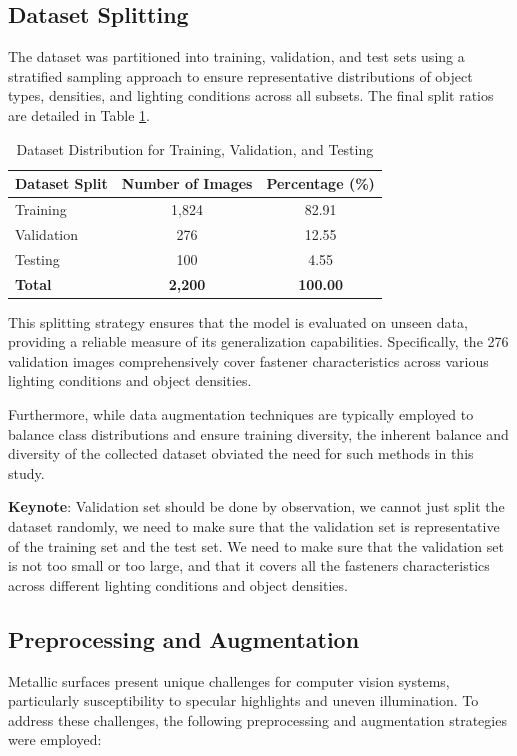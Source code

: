 \subsection{Dataset Splitting}

The dataset was partitioned into training, validation, and test sets using a stratified sampling approach to ensure representative distributions of object types, densities, and lighting conditions across all subsets. The final split ratios are detailed in Table \ref{tab:datasets}.

\begin{table}[htbp]
\centering
\caption{Dataset Distribution for Training, Validation, and Testing}
\label{tab:datasets}
\begin{tabular}{lcc} 
\toprule
\textbf{Dataset Split} & \textbf{Number of Images} & \textbf{Percentage (\%)} \\
\midrule
Training   & 1,824 & 82.91 \\
Validation & 276   & 12.55 \\
Testing    & 100   & 4.55  \\
\midrule
\textbf{Total} & \textbf{2,200} & \textbf{100.00} \\
\bottomrule
\end{tabular}
\end{table}

This splitting strategy ensures that the model is evaluated on unseen data, providing a reliable measure of its generalization capabilities. Specifically, the 276 validation images comprehensively cover fastener characteristics across various lighting conditions and object densities.

Furthermore, while data augmentation techniques are typically employed to balance class distributions and ensure training diversity, the inherent balance and diversity of the collected dataset obviated the need for such methods in this study.

\textbf{Keynote}: Validation set should be done by observation, we cannot just split the dataset randomly, we need to make sure that the validation set is representative of the training set and the test set. We need to make sure that the validation set is not too small or too large, and that it covers all the fasteners characteristics across different lighting conditions and object densities.

\subsection{Preprocessing and Augmentation}
Metallic surfaces present unique challenges for computer vision systems, particularly susceptibility to specular highlights and uneven illumination. To address these challenges, the following preprocessing and augmentation strategies were employed:


